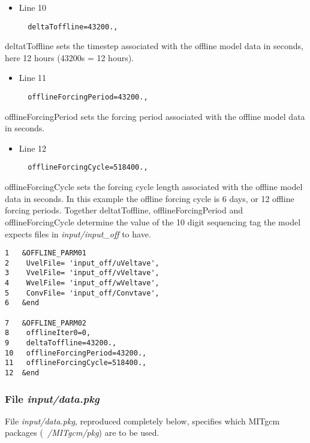 \begin{itemize}
\item Line 10
\begin {verbatim}
  deltaToffline=43200.,
\end{verbatim}
\end{itemize}


\noindent deltatToffline sets the timestep associated with the offline
model data in seconds, here 12 hours (43200s = 12 hours).

\begin{itemize}
\item Line 11
\begin {verbatim}
  offlineForcingPeriod=43200.,
\end{verbatim}
\end{itemize}

\noindent offlineForcingPeriod sets the forcing period associated with
the offline model data in seconds.

\begin{itemize}
\item Line 12
\begin {verbatim}
  offlineForcingCycle=518400.,
\end{verbatim}
\end{itemize}

\noindent offlineForcingCycle sets the forcing cycle length associated
with the offline model data in seconds. In this example the offline
forcing cycle is 6 days, or 12 offline forcing periods.  Together
deltatToffline, offlineForcingPeriod and offlineForcingCycle determine
the value of the 10 digit sequencing tag the model expects files in
{\it input/input\_off} to have.


\begin {verbatim}
1   &OFFLINE_PARM01
2    UvelFile= 'input_off/uVeltave',
3    VvelFile= 'input_off/vVeltave',
4    WvelFile= 'input_off/wVeltave',
5    ConvFile= 'input_off/Convtave',
6   &end

7   &OFFLINE_PARM02
8    offlineIter0=0,
9    deltaToffline=43200.,
10   offlineForcingPeriod=43200.,
11   offlineForcingCycle=518400.,
12  &end
\end{verbatim}


\subsubsection{File {\it input/data.pkg}}
\label{www:tutorials}

\noindent File {\it input/data.pkg}, reproduced completely below,
specifies which MITgcm packages ({\it ~/MITgcm/pkg}) are to be used.


